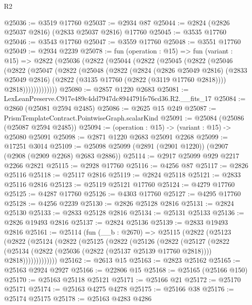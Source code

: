 \begin{lexlean}{R2}
\begin{coremodule}
@25036 := @3519 @17760
@25037 := @2934 @87
@25044 := @2824 (@2826 @25037 @2816) (@2833 @25037 @2816) @17760
@25045 := @3535 @17760
@25046 := @3543 @17760
@25047 := @3559 @17760
@25048 := @3551 @17760
@25049 := @2934 @2239
@25078 := fun (operation : @15) =>
  fun (variant : @15) =>
  @2822
    (@25036
      (@2822
        (@25044
          (@2822
            (@25045
              (@2822
                (@25046
                  (@2822
                    (@25047
                      (@2822
                        (@25048
                          (@2822
                            (@2824
                              (@2826 @25049 @2816)
                              (@2833 @25049 @2816)
                              (@2822 (@3135 @17760 (@2822 (@3119 @17760 @2818))))
                              @2818)))))))))))))
@25080 := @2857 @1220 @2683
@25081 := LexLeanPreserve.C917e489c4dd7947dc8944791fe76cd36.R2.__fits_17
@25084 := @2860 (@25081 @2594 @2485)
@25086 := @2625 @15 @249
@25087 := PrismTemplateContract.PointwiseGraph.scalarKind
@25091 := @25084 (@25086 (@25087 @2594 @2485))
@25094 := (operation : @15) -> (variant : @15) -> @25080 @25091
@25098 := @2871 @1220 @2683 @25091 @2268
@25099 := @17251 @3014
@25109 := @25098 @25099 (@2891 (@2901 @1220)) (@2907 (@2908 (@2909 @2268) @2683 @2886))
@25114 := @2917 @25099 @929 @2217 @2266 @2821
@25115 := @2928 @17760
@25116 := @4256 @87
@25117 := @2826 @25116
@25118 := @25117 @2816
@25119 := @2824 @25118
@25121 := @2833 @25116 @2816
@25123 := @25119 @25121 @17760
@25124 := @4279 @17760
@25125 := @4287 @17760
@25126 := @4303 @17760
@25127 := @4295 @17760
@25128 := @4256 @2239
@25130 := @2826 @25128 @2816
@25131 := @2824 @25130
@25133 := @2833 @25128 @2816
@25134 := @25131 @25133
@25136 := @2826 @19493 @2816
@25137 := @2824 @25136
@25139 := @2833 @19493 @2816
@25161 := @25114
    (fun (__b : @2670) =>
    @25115
      (@2822
        (@25123
          (@2822
            (@25124
              (@2822
                (@25125
                  (@2822
                    (@25126
                      (@2822
                        (@25127
                          (@2822
                            (@25134
                              (@2822 (@25036 (@2822 (@25137 @25139 @17760 @2818))))
                              @2818)))))))))))))
@25162 := @2613 @15
@25163 := @2823 @25162
@25165 := @25163 @2924 @2927
@25166 := @22806 @15
@25168 := @25165 (@25166 @150)
@25170 := @25163 @25118 @25121
@25171 := @25166 @21
@25172 := @25170 @25171
@25174 := @25163 @4275 @4278
@25175 := @25166 @38
@25176 := @25174 @25175
@25178 := @25163 @4283 @4286

\end{coremodule}
\end{lexlean}
